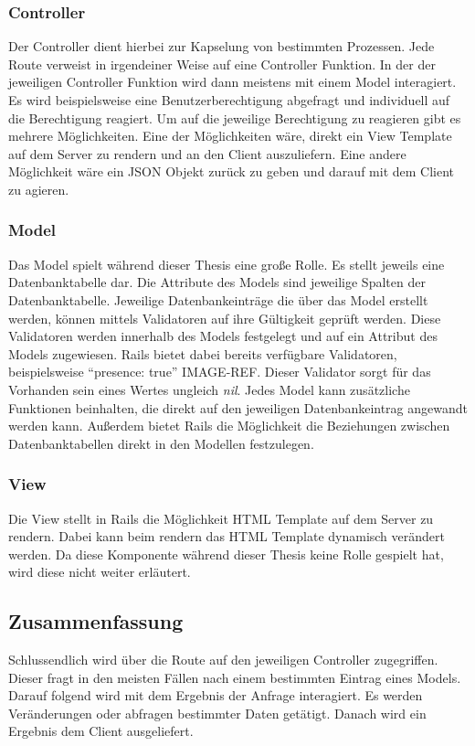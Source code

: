 \documentclass[11pt]{article}
\newcommand{\hlnote}[2]{#1}
\newcommand{\hlnote}[2]{\todo{#2}\texthl{#1}}
\begin{document}
	\subsubsection{Controller}
	\label{sec: rails_controller}
	Der Controller dient hierbei zur Kapselung von bestimmten Prozessen. Jede Route verweist in irgendeiner Weise auf eine Controller Funktion. In der der jeweiligen Controller Funktion wird dann meistens mit einem Model interagiert. Es wird beispielsweise eine Benutzerberechtigung abgefragt und individuell auf die Berechtigung reagiert. Um auf die jeweilige Berechtigung zu reagieren gibt es mehrere Möglichkeiten. Eine der Möglichkeiten wäre, direkt ein View Template auf dem Server zu rendern und an den Client auszuliefern. Eine andere Möglichkeit wäre ein \gls{JSON} Objekt zurück zu geben und darauf mit dem Client zu agieren.
	
	\subsubsection{Model}
	\label{sec: rails_model}
	Das Model spielt während dieser Thesis \hlnote{eine große Rolle}{weasel}. Es stellt jeweils eine Datenbanktabelle dar. Die Attribute des Models sind jeweilige Spalten der Datenbanktabelle. Jeweilige Datenbankeinträge die über das Model erstellt werden, können mittels Validatoren auf ihre Gültigkeit geprüft werden. Diese Validatoren werden innerhalb des Models festgelegt und auf ein Attribut des Models zugewiesen. Rails bietet dabei bereits verfügbare Validatoren, beispielsweise \enquote{presence: true} \hlnote{IMAGE-REF}{Bild Referenz}. Dieser Validator sorgt für das Vorhanden sein eines Wertes ungleich \textit{nil}. Jedes Model kann zusätzliche Funktionen beinhalten, die direkt auf den jeweiligen Datenbankeintrag angewandt werden kann. Außerdem bietet Rails die Möglichkeit die Beziehungen zwischen Datenbanktabellen direkt in den Modellen festzulegen.
	
	\subsubsection{View}
	\label{sec: rails_view}
	Die View stellt in Rails die Möglichkeit \gls{HTML} Template auf dem Server zu rendern. Dabei kann beim rendern das \gls{HTML} Template dynamisch verändert werden. Da diese Komponente während dieser Thesis keine Rolle gespielt hat, wird diese nicht weiter erläutert.
	
	\subsection{Zusammenfassung}
	\label{sec: rails_resuemee}
	Schlussendlich wird über die Route auf den jeweiligen Controller zugegriffen. Dieser fragt in den meisten Fällen nach einem bestimmten Eintrag eines Models. Darauf folgend wird mit dem Ergebnis der Anfrage interagiert. Es werden Veränderungen oder abfragen bestimmter Daten getätigt. Danach wird ein Ergebnis dem Client ausgeliefert.
	
\end{document}
